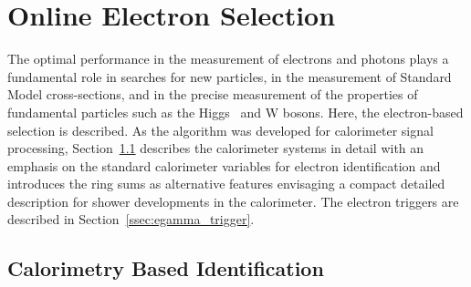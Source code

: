 \chapter{Online Electron Selection}\label{sec:context}


The optimal performance in the measurement of electrons and photons plays a fundamental role in searches for new particles, in the measurement of Standard Model cross-sections, and in the precise measurement of the properties of fundamental particles such as the Higgs~\cite{HIGG-2012-27,HIGG-2016-33} and W bosons. Here, the electron-based selection is described. As the \rnn{} algorithm was developed for calorimeter signal processing, Section~\ref{sec:atlas_trigger} describes the calorimeter systems in detail with an emphasis on the standard calorimeter variables for electron identification and introduces the ring sums as alternative features envisaging a compact detailed description for shower developments in the calorimeter. The electron triggers are described in Section~\ref{ssec:egamma_trigger}.



\section{Calorimetry Based Identification}\label{sec:atlas_trigger}

